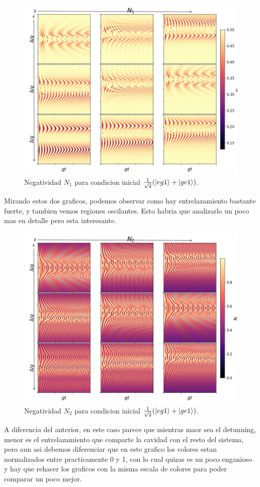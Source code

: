 \begin{figure}
    \centering
    \includegraphics[width=0.8\linewidth]{figuras/ch2/negatividad/3x3 eg1+ $N_1$ 012 012.png}
    \caption{Negatividad $N_{1}$ para condicion inicial $\frac{1}{\sqrt{2}}(\ket{eg1}+\ket{ge1})$.}
    \label{fig2:N_1_eg1+}
\end{figure}
Mirando estos dos graficos, podemos observar como hay entrelazamiento bastante fuerte, y tambien vemos regiones oscilantes. Esto habria que analizarlo un poco mas en detalle pero esta interesante.
\begin{figure}
    \centering
    \includegraphics[width=0.8\linewidth]{figuras/ch2/negatividad/3x3 eg1+ $N_2$ 012 012.png}
    \caption{Negatividad $N_{2}$ para condicion inicial $\frac{1}{\sqrt{2}}(\ket{eg1}+\ket{ge1})$.}
    \label{fig2:N_2_eg1+}
\end{figure}
A diferencia del anterior, en este caso parece que mientras maor sea el detunning, menor es el entrelazamiento que comparte la cavidad con el resto del sistema, pero aun asi debemos diferenciar que en este grafico los colores estan normalizados entre practicamente 0 y 1, con lo cual quizas es un poco enganioso y hay que rehacer los graficos con la misma escala de colores para poder comparar un poco mejor.

